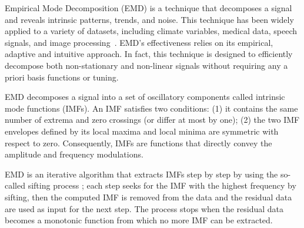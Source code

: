 Empirical Mode Decomposition (EMD) \cite{huang:emd1998} is a technique that decomposes a signal and reveals intrinsic patterns, 
trends, and noise.
This technique has been widely applied to a variety of datasets, including climate variables\cite{lee:climateEMD2011}, medical 
data\cite{blanco:bioMed2008}, speech signals\cite{huang:signalProc2006,hasan:ieeeletter2009}, and image processing~\cite{nunes:vision2005}.
EMD's effectiveness relies on its empirical, adaptive and intuitive approach.
In fact, this technique is designed to efficiently decompose both non-stationary and non-linear signals without requiring any 
a priori basis functions or tuning.  

EMD decomposes a signal into a set of oscillatory components called intrinsic mode functions (IMFs). 
An IMF satisfies two conditions: (1) it contains the same number of extrema and zero crossings (or differ at most by one); (2) the two 
IMF envelopes defined by its local maxima and local minima are symmetric with respect to zero.  Consequently, 
 IMFs are functions that directly convey the amplitude and frequency modulations.

EMD is an iterative algorithm that extracts IMFs step by step by using the so-called sifting 
process \cite{huang:emd1998}; each step seeks for the IMF with the highest frequency by sifting, then 
the computed IMF is removed from the data and the residual data are used as input for the 
next step.
The process stops when the residual data becomes a monotonic function from which no more IMF can be extracted.

